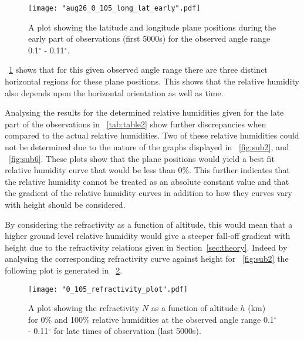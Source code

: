 \documentclass{article}
\newcommand{\figref}[2][\figurename~]{#1\ref{#2}}
\newcommand{\tabref}[2][\tablename~]{#1\ref{#2}}
\newcommand{\secref}[2][Section~]{#1\ref{#2}}
\begin{document}
\begin{figure}[h]
\centering
\texttt{[image: "aug26\_0\_105\_long\_lat\_early".pdf]}
\caption{A plot showing the latitude and longitude plane positions during the early part of observations (first 5000s) for the observed angle range 0.1$^{\circ}$ - 0.11$^{\circ}$.}
\label{fig:long_lat_plot}
\end{figure}


\vspace{2mm}
\noindent
\figref{fig:long_lat_plot} shows that for this given observed angle range there are three distinct horizontal regions for these plane positions. This shows that the relative humidity also depends upon the horizontal orientation as well as time.

\vspace{2mm}
\noindent
Analysing the results for the determined relative humidities given for the late part of the observations in \tabref{tab:table2} show further discrepancies when compared to the actual relative humidities. Two of these relative humidities could not be determined due to the nature of the graphs displayed in \figref{fig:sub2}, and \figref{fig:sub6}. These plots show that the plane positions would yield a best fit relative humidity curve that would be less than 0$\%$. This further indicates that the relative humidity cannot be treated as an absolute constant value and that the gradient of the relative humidity curves in addition to how they curves vary with height should be considered. 


\vspace{2mm}
\noindent
By considering the refractivity as a function of altitude, this would mean that a higher ground level relative humidity would give a steeper fall-off gradient with height due to the refractivity relations given in \secref{sec:theory}. Indeed by analysing the corresponding refractivity curve against height for \figref{fig:sub2} the following plot is generated in \figref{fig:refractivity_plot}.

\begin{figure}[h]
\centering
\texttt{[image: "0\_105\_refractivity\_plot".pdf]}
\caption{A plot showing the refractivity $N$ as a function of altitude $h$ (km) for 0$\%$ and 100$\%$ relative humidities at the observed angle range 0.1$^{\circ}$ - 0.11$^{\circ}$ for late times of observation (last 5000s).}
\label{fig:refractivity_plot}
\end{figure}
\end{document}
